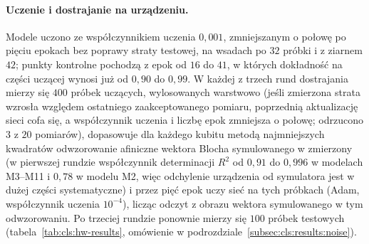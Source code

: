 \paragraph{Uczenie i dostrajanie na urządzeniu.}
Modele uczono ze współczynnikiem uczenia $0{,}001$, zmniejszanym o połowę po pięciu epokach bez poprawy straty testowej, na wsadach po $32$ próbki i z ziarnem $42$; punkty kontrolne pochodzą z epok od $16$ do $41$, w których dokładność na części uczącej wynosi już od $0{,}90$ do $0{,}99$.
W każdej z trzech rund dostrajania mierzy się $400$ próbek uczących, wylosowanych warstwowo (jeśli zmierzona strata wzrosła względem ostatniego zaakceptowanego pomiaru, poprzednią aktualizację sieci cofa się, a współczynnik uczenia i liczbę epok zmniejsza o połowę; odrzucono $3$ z $20$ pomiarów), dopasowuje dla każdego kubitu metodą najmniejszych kwadratów odwzorowanie afiniczne wektora Blocha symulowanego w zmierzony (w pierwszej rundzie współczynnik determinacji $R^2$ od $0{,}91$ do $0{,}996$ w modelach M3--M11 i $0{,}78$ w modelu M2, więc odchylenie urządzenia od symulatora jest w dużej części systematyczne) i przez pięć epok uczy sieć na tych próbkach (Adam, współczynnik uczenia $10^{-4}$), licząc odczyt z obrazu wektora symulowanego w tym odwzorowaniu.
Po trzeciej rundzie ponownie mierzy się $100$ próbek testowych (tabela~\ref{tab:cls:hw-results}, omówienie w podrozdziale~\ref{subsec:cls:results:noise}).

